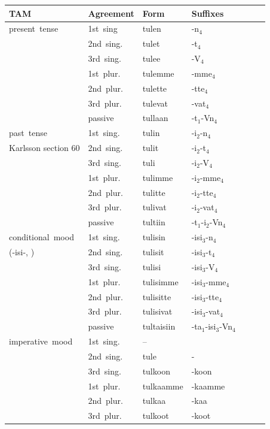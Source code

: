 \documentclass[11pt,letterpaper]{article}
\begin{document}
\begin{table}
\begin{tabular}{l|llllll}
	TAM & Agreement & Form & Suffixes \\ \hline\hline
	present tense & 	1st sing& 	tulen  & -n$_4$\\ 
	\cite[Section 24]{karlsson1999finnish}	&	2nd sing. 	& 	tulet  & -t$_4$\\ 
	&	3rd sing. 	& 	tulee  & -V$_4$\\                
	&	1st plur. 	& 	tulemme  &-mme$_4$\\ 
	&	2nd plur. 	& 	tulette  &-tte$_4$\\ 
	&	3rd plur. 	& 	tulevat  &-vat$_4$\\ 
	&	passive 	& 	tullaan  &-t$_1$-Vn$_4$ \\  \hline
past tense 	 	&	1st sing.& 	tulin & -i$_2$-n$_4$\\  
	Karlsson section 60&	2nd sing. &	tulit  & -i$_2$-t$_4$\\ 
	&	3rd sing. &	tuli  & -i$_2$-V$_4$\\ 
	&	1st plur. &	tulimme  &-i$_2$-mme$_4$\\ 
	&	2nd plur. &	tulitte  &-i$_2$-tte$_4$\\ 
	&3rd plur. &	tulivat  & -i$_2$-vat$_4$\\ 
	&	passive &	tultiin  &-t$_1$-i$_2$-Vn$_4$ \\  \hline
conditional mood  &1st sing. &	tulisin  & -isi$_3$-n$_4$\\ 
	(-isi-, \cite[Section 65]{karlsson1999finnish})	&2nd sing. &	tulisit  & -isi$_3$-t$_4$\\ 
	&3rd sing. &	tulisi  & -isi$_3$-V$_4$\\ 
	&1st plur. &	tulisimme  & -isi$_3$-mme$_4$\\ 
	&2nd plur. &	tulisitte  & -isi$_3$-tte$_4$\\ 
	&3rd plur. &	tulisivat  & -isi$_3$-vat$_4$ \\ 
	&passive &	tultaisiin  & -ta$_1$-isi$_3$-Vn$_4$\\  \hline
	imperative mood  &1st sing. &	-- \\ 
	 \cite[Section 66]{karlsson1999finnish}	 & 2nd sing. &	tule & - \\ 
	&	3rd sing. &	tulkoon  & -koon\\ 
	&	1st plur. &	tulkaamme  & -kaamme\\ 
	&	2nd plur. &	tulkaa   & -kaa\\ 
	&	3rd plur. 	&tulkoot  & -koot\\ 

\end{tabular}
\end{table}
\end{document}
